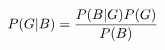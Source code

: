\documentclass[preview]{standalone}
\begin{document}
\begin{align*}
\special{dvisvgm:raw <g id='unique000'>}P(G|B) = \frac{P(B|G)P(G)}{P(B)}\special{dvisvgm:raw </g>}
\end{align*}
\end{document}
